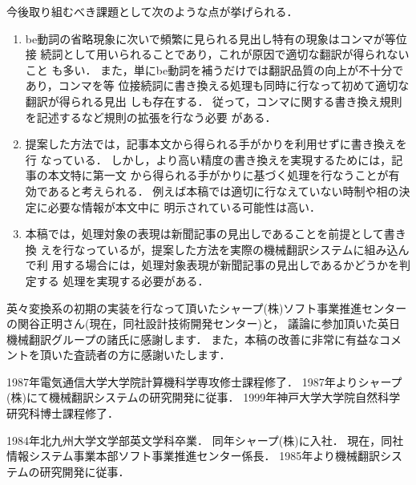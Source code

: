 今後取り組むべき課題として次のような点が挙げられる．
\begin{enumerate}
\item
be動詞の省略現象に次いで頻繁に見られる見出し特有の現象はコンマが等位接
続詞として用いられることであり，これが原因で適切な翻訳が得られないこと
も多い．
また，単にbe動詞を補うだけでは翻訳品質の向上が不十分であり，コンマを等
位接続詞に書き換える処理も同時に行なって初めて適切な翻訳が得られる見出
しも存在する．
従って，コンマに関する書き換え規則を記述するなど規則の拡張を行なう必要
がある．
\item
提案した方法では，記事本文から得られる手がかりを利用せずに書き換えを行
なっている．
しかし，より高い精度の書き換えを実現するためには，記事の本文特に第一文
から得られる手がかりに基づく処理を行なうことが有効であると考えられる．
例えば本稿では適切に行なえていない時制や相の決定に必要な情報が本文中に
明示されている可能性は高い．
\item
本稿では，処理対象の表現は新聞記事の見出しであることを前提として書き換
えを行なっているが，提案した方法を実際の機械翻訳システムに組み込んで利
用する場合には，処理対象表現が新聞記事の見出しであるかどうかを判定する
処理を実現する必要がある．
\end{enumerate}

\acknowledgment

英々変換系の初期の実装を行なって頂いたシャープ(株)ソフト事業推進センター
の関谷正明さん(現在，同社設計技術開発センター)と，
議論に参加頂いた英日機械翻訳グループの諸氏に感謝します．
また，本稿の改善に非常に有益なコメントを頂いた査読者の方に感謝いたします．




\begin{biography}
{1987年電気通信大学大学院計算機科学専攻修士課程修了．
1987年よりシャープ(株)にて機械翻訳システムの研究開発に従事．
1999年神戸大学大学院自然科学研究科博士課程修了．}

{1984年北九州大学文学部英文学科卒業．
同年シャープ(株)に入社．
現在，同社情報システム事業本部ソフト事業推進センター係長．
1985年より機械翻訳システムの研究開発に従事．}


\end{biography}


